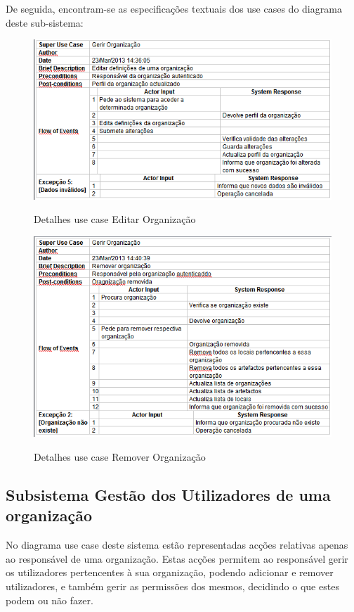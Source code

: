 ﻿\documentclass[12pt,a4paper]{article}
\begin{document}
De seguida, encontram-se as especificações textuais dos use cases do diagrama deste sub-sistema:\\

\begin{figure}[h!]
\centering
\includegraphics[scale=0.7]{d_usecase/editarorganizacao}
\label{usecase}
\caption{Detalhes use case Editar Organização}
\end{figure}

\begin{figure}[h!]
\centering
\includegraphics[scale=0.7]{d_usecase/removerorganizacao}
\label{usecase}
\caption{Detalhes use case Remover Organização}
\end{figure}

\clearpage

\subsection{Subsistema Gestão dos Utilizadores de uma organização}
No diagrama use case deste sistema estão representadas acções relativas apenas ao responsável de uma organização. Estas acções permitem ao responsável gerir os utilizadores pertencentes à sua organização, podendo adicionar e remover utilizadores, e também gerir as permissões dos mesmos, decidindo o que estes podem ou não fazer.\\
\end{document}
